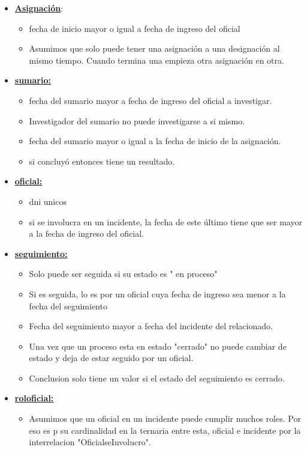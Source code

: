 \begin{itemize}

\item\uline{\textbf{Asignación}}:
\begin{itemize}
\item fecha de inicio mayor o igual a fecha de ingreso del oficial
\item Asumimos que solo puede tener una asignación a una designación al mismo tiempo. Cuando termina una
empieza otra asignación en otra.
\end{itemize}


\item\uline{\textbf{sumario:}}
\begin{itemize}
\item fecha del sumario mayor a fecha de ingreso del oficial a investigar.
\item Investigador del sumario no puede investigarse a si mismo.
\item fecha del sumario mayor o igual a la fecha de inicio de la asignación.
\item si concluyó entonces tiene un resultado. 
\end{itemize}
\item\uline{\textbf{oficial:}}
\begin{itemize}
\item dni unicos
\item  si se involucra en un incidente, la fecha de este último tiene que ser mayor a la fecha
de ingreso del oficial.
\end{itemize}
\item\uline{\textbf{seguimiento:}}
\begin{itemize}
\item Solo puede ser seguida si su estado es " en proceso"
\item Si es seguida, lo es por un oficial cuya fecha de ingreso sea menor a la fecha del seguimiento
\item Fecha del seguimiento mayor a fecha del incidente del relacionado.
\item Una vez que un proceso esta en estado "cerrado" no puede cambiar de estado y deja de estar seguido por un oficial.
\item Conclusion solo tiene un valor si el estado del seguimiento es cerrado.
\end{itemize}
\item\uline{\textbf{roloficial:}}
\begin{itemize}
\item Asumimos que un oficial en un incidente puede cumplir muchos roles. Por eso es p su cardinalidad en la ternaria entre esta, oficial e incidente por la interrelacion "OficialseInvolucro".
\end{itemize}


\end{itemize}
